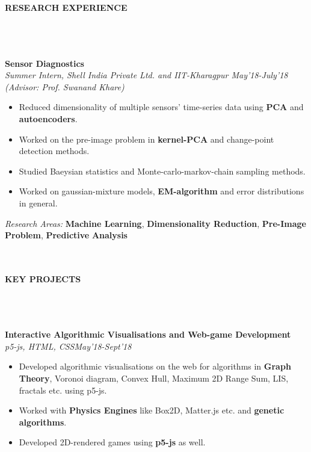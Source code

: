 \documentclass[letter,10pt]{book}
\newcommand{\lsep}{-0.5cm}
\newcommand{\resheading}[1]{{\small \colorbox{mygrey}{\begin{minipage}{0.975\textwidth}{\textbf{#1 \vphantom{p\^{E}}}}\end{minipage}}}}
\begin{document}
\hfill 
\hspace{0.5cm}\\[-0.1cm]\\
\resheading{\textbf{RESEARCH EXPERIENCE} }\\[\lsep]
\\
\\
\large \textbf{Sensor Diagnostics} \normalsize \\
\emph{Summer Intern, Shell India Private Ltd. and IIT-Kharagpur \hfill May'18-July'18} \\ 
\emph{(Advisor: Prof. Swanand Khare)} \\[-2em]
\begin{itemize}
\item Reduced dimensionality of multiple sensors' time-series data using \textbf{PCA} and  \textbf{autoencoders}.\\[-2em]
\item Worked on the pre-image problem in  \textbf{kernel-PCA} and change-point detection methods.\\[-2em]
\item Studied Baeysian statistics and Monte-carlo-markov-chain sampling methods.\\[-2em]
\item Worked on gaussian-mixture models, \textbf{EM-algorithm} and error distributions in general.\\[-1.8em]
\end{itemize}
\emph{Research Areas:}  \textbf{Machine Learning}, \textbf{Dimensionality Reduction},
\textbf{Pre-Image Problem},  \textbf{Predictive}  \textbf{Analysis}
\\
\hspace{0cm}\\[-0.2cm]\\
\resheading{\textbf{ KEY PROJECTS } }\\[\lsep]
\\\\ \large \textbf{Interactive Algorithmic Visualisations and Web-game Development} \normalsize\\
\emph{p5-js, HTML, CSS\hfill May'18-Sept'18} \\[-2em]
\begin{itemize}
\item Developed algorithmic visualisations on the web for algorithms in \textbf{Graph Theory}, Voronoi diagram, Convex Hull, Maximum 2D Range Sum, LIS, fractals etc. using p5-js.\\[-2em]
\item Worked with \textbf{Physics Engines} like Box2D, Matter.js etc. and \textbf{genetic algorithms}.\\[-2em]
\item Developed 2D-rendered games using  \textbf{p5-js} as well.\\[-1.8em]
\end{itemize}
\end{document}
